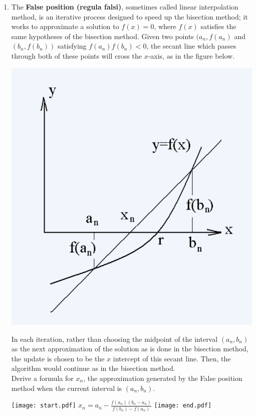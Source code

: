 \documentclass[12pt]{article}
\begin{document}
\begin{enumerate}
\item The  {\bf False position (regula falsi)}, sometimes called linear interpolation method, is an iterative process designed to speed up the bisection method; it works to approximate a solution to $f(x)=0$, where $f(x)$ satisfies the same hypotheses of the bisection method.  Given two points $(a_n,f(a_n)$ and $(b_n,f(b_n))$ satisfying $f(a_n)f(b_n)<0$, the secant line which passes through both of these points will cross the $x$-axis, as in the figure below.
\begin{center}
\includegraphics[scale=0.5]{LinearInterp.png}
\end{center}
In each iteration, rather than choosing the midpoint of the interval $(a_n,b_n)$ as the next approximation of the solution as is done in the bisection method, the update is chosen to be the $x$ intercept of this secant line.  Then, the algorithm would continue as in the bisection method.\\

Derive a formula for $x_n$, the approximation generated by the False position method when the current interval is $(a_n,b_n)$.

\texttt{[image: start.pdf]}
{{$x_{n} = a_n - \frac{f(a_n)(b_n-a_n)}{f(b_n)-f(a_n)}$}}
\texttt{[image: end.pdf]}


\end{enumerate}
\end{document}

